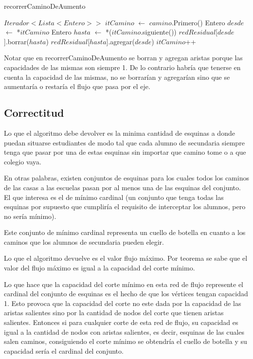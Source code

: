 \begin{algorithm}[]
	\caption{recorrerCaminoDeAumento}

	$Iterador<Lista<Entero>>$ $itCamino$ $\gets$ $camino$.Primero() \;
	 {
		Entero $desde$ $\gets$ *$itCamino$ \;
		Entero $hasta$ $\gets$ *($itCamino$.siguiente()) \;
		$redResidual$[$desde$].borrar($hasta$) \;
		$redResidual$[$hasta$].agregar($desde$) \;
		$itCamino$++ \;
	}
\end{algorithm}

Notar que en recorrerCaminoDeAumento se borran y agregan aristas porque las capacidades de las mismas son siempre 1. De lo contrario habría que tenerse en cuenta la capacidad de las mismas, no se borrarían y agregarían sino que se aumentaría o restaría el flujo que pasa por el eje.

\subsection{Correctitud}

Lo que el algoritmo debe devolver es la minima cantidad de esquinas a donde puedan situarse estudiantes de modo tal que cada alumno de secundaria siempre tenga que pasar por una de estas esquinas sin importar que camino tome o a que colegio vaya.

En otras palabras, existen conjuntos de esquinas para los cuales todos los caminos de las casas a las escuelas pasan por al menos una de las esquinas del conjunto. El que interesa es el de mínimo cardinal (un conjunto que tenga todas las esquinas por supuesto que cumpliría el requisito de interceptar los alumnos, pero no sería mínimo).

Este conjunto de mínimo cardinal representa un cuello de botella en cuanto a los caminos que los alumnos de secundaria pueden elegir.

Lo que el algoritmo devuelve es el valor flujo máximo. Por teorema se sabe que el valor del flujo máximo es igual a la capacidad del corte mínimo.

Lo que hace que la capacidad del corte mínimo en esta red de flujo represente el cardinal del conjunto de esquinas es el hecho de que los vértices tengan capacidad 1. Esto provoca que la capacidad del corte no este dada por la capacidad de las aristas salientes sino por la cantidad de nodos del corte que tienen aristas salientes. Entonces si para cualquier corte de esta red de flujo, su capacidad es igual a la cantidad de nodos con aristas salientes, es decir, esquinas de las cuales salen caminos, consiguiendo el corte mínimo se obtendría el cuello de botella y su capacidad sería el cardinal del conjunto.

